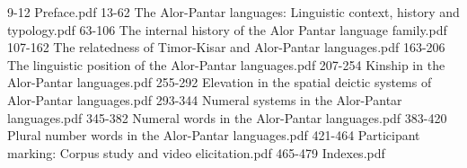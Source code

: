 9-12    Preface.pdf
13-62   The Alor-Pantar languages: Linguistic context, history and typology.pdf
63-106  The internal history of the Alor Pantar language family.pdf
107-162 The relatedness of Timor-Kisar and Alor-Pantar languages.pdf
163-206 The linguistic position of the Alor-Pantar languages.pdf
207-254 Kinship in the Alor-Pantar languages.pdf
255-292 Elevation in the spatial deictic systems of Alor-Pantar languages.pdf
293-344 Numeral systems in the Alor-Pantar languages.pdf
345-382 Numeral words in the Alor-Pantar languages.pdf
383-420 Plural number words in the Alor-Pantar languages.pdf
421-464 Participant marking: Corpus study and video elicitation.pdf
465-479 Indexes.pdf